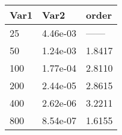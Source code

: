 \begin{tabular}{lll}
Var1 & Var2 & order \\ 
\hline 
25 & 4.46e-03 & ------ \\ 
50 & 1.24e-03 & 1.8417 \\ 
100 & 1.77e-04 & 2.8110 \\ 
200 & 2.44e-05 & 2.8615 \\ 
400 & 2.62e-06 & 3.2211 \\ 
800 & 8.54e-07 & 1.6155 \\ 
\hline 
\end{tabular}